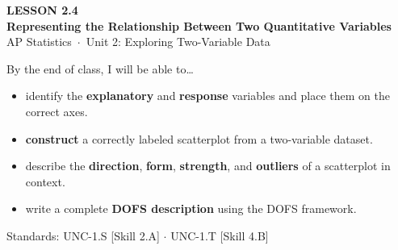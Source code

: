 \documentclass[aspectratio=169, 11pt]{beamer}
\begin{document}
{
\begin{frame}[plain]
  \vspace{2.8cm}\hspace{0.55cm}%
  \begin{minipage}{0.9\textwidth}
    {\color{goldacc}\bfseries\small LESSON 2.4}\\[0.5cm]
    {\color{white}\bfseries\LARGE Representing the Relationship Between Two Quantitative Variables}\\[1.2cm]
    {\color{skymid}\small AP Statistics~$\cdot$~Unit 2: Exploring Two-Variable Data}
  \end{minipage}
\end{frame}
}

\begin{frame}[t, plain]
  \vspace{0.3cm}
  By the end of class, I will be able to\dots
  \begin{itemize}
    \item identify the \textbf{explanatory} and \textbf{response} variables and place them on the correct axes.
    \item \textbf{construct} a correctly labeled scatterplot from a two-variable dataset.
    \item describe the \textbf{direction}, \textbf{form}, \textbf{strength}, and \textbf{outliers} of a scatterplot in context.
    \item write a complete \textbf{DOFS description} using the DOFS framework.
  \end{itemize}
  \vspace{0.4cm}
  \textcolor{goldacc}{\small Standards: UNC-1.S [Skill 2.A] $\cdot$ UNC-1.T [Skill 4.B]}
\end{frame}
\end{document}
